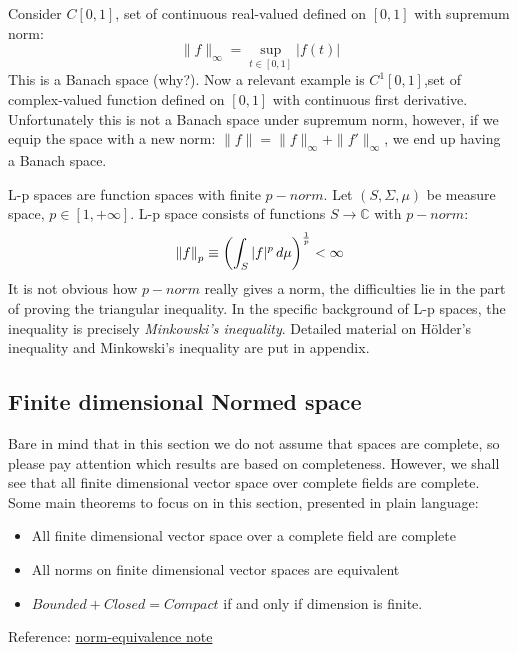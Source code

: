 \begin{example}\rm\nextline
	Consider $C[0,1]$, set of continuous real-valued defined on $[0,1]$ with supremum norm:
	$$\|f\|_\infty=\sup_{t \in [0,1]} |f(t)|$$ This is a Banach space (why?). Now a relevant example is $C^1[0,1]$,set of complex-valued function defined on $[0,1]$ with continuous first derivative. Unfortunately this is not a Banach space under supremum norm, however, if we equip the space with a new norm: $\|f\|=\|f\|_\infty+\|f'\|_\infty$, we end up having a Banach space.\hfill
\end{example}

\begin{example}[L-p spaces]\rm\label{lp space1}\nextline
	L-p spaces are function spaces with finite $p-norm$. Let $(S,\Sigma,\mu)$ be measure space, $p\in[1,+\infty]$. L-p space consists of functions $S\xrightarrow{}\mathbb{C}$ with $p-norm$:
	$$\left\|{f}\right\|_p\equiv\left(\int_S|f|^p \,d\mu\right)^\frac{1}{p}<\infty$$
	It is not obvious how $p-norm$ really gives a norm, the difficulties lie in the part of proving the triangular inequality. In the specific background of L-p spaces, the inequality is precisely \textit{Minkowski's inequality}. Detailed material on Hölder's inequality and Minkowski's inequality are put in appendix.
\end{example}


\subsection{Finite dimensional Normed space}\label{finite dimensional Banach}
Bare in mind that in this section we do not assume that spaces are complete, so please pay attention which results are based on completeness. However, we shall see that all finite dimensional vector space over complete fields are complete.\\
Some main theorems to focus on in this section, presented in plain language:
\begin{itemize}
	\item All finite dimensional vector space over a complete field are complete
	\item All norms on finite dimensional vector spaces are equivalent
	\item $Bounded+Closed=Compact$ if and only if dimension is finite.
\end{itemize}
Reference: \href{https://math.mit.edu/~stevenj/18.335/norm-equivalence.pdf}{norm-equivalence note}

